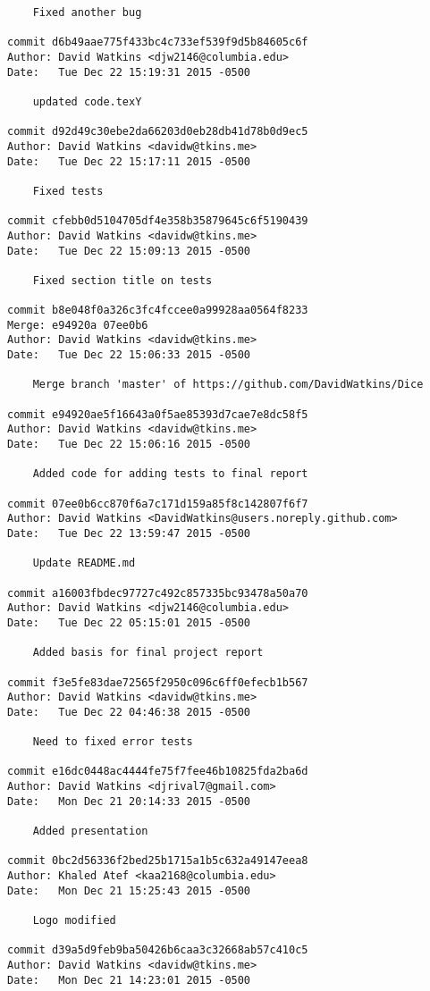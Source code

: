 \begin{verbatim}
    Fixed another bug

commit d6b49aae775f433bc4c733ef539f9d5b84605c6f
Author: David Watkins <djw2146@columbia.edu>
Date:   Tue Dec 22 15:19:31 2015 -0500

    updated code.texY

commit d92d49c30ebe2da66203d0eb28db41d78b0d9ec5
Author: David Watkins <davidw@tkins.me>
Date:   Tue Dec 22 15:17:11 2015 -0500

    Fixed tests

commit cfebb0d5104705df4e358b35879645c6f5190439
Author: David Watkins <davidw@tkins.me>
Date:   Tue Dec 22 15:09:13 2015 -0500

    Fixed section title on tests

commit b8e048f0a326c3fc4fccee0a99928aa0564f8233
Merge: e94920a 07ee0b6
Author: David Watkins <davidw@tkins.me>
Date:   Tue Dec 22 15:06:33 2015 -0500

    Merge branch 'master' of https://github.com/DavidWatkins/Dice

commit e94920ae5f16643a0f5ae85393d7cae7e8dc58f5
Author: David Watkins <davidw@tkins.me>
Date:   Tue Dec 22 15:06:16 2015 -0500

    Added code for adding tests to final report

commit 07ee0b6cc870f6a7c171d159a85f8c142807f6f7
Author: David Watkins <DavidWatkins@users.noreply.github.com>
Date:   Tue Dec 22 13:59:47 2015 -0500

    Update README.md

commit a16003fbdec97727c492c857335bc93478a50a70
Author: David Watkins <djw2146@columbia.edu>
Date:   Tue Dec 22 05:15:01 2015 -0500

    Added basis for final project report

commit f3e5fe83dae72565f2950c096c6ff0efecb1b567
Author: David Watkins <davidw@tkins.me>
Date:   Tue Dec 22 04:46:38 2015 -0500

    Need to fixed error tests

commit e16dc0448ac4444fe75f7fee46b10825fda2ba6d
Author: David Watkins <djrival7@gmail.com>
Date:   Mon Dec 21 20:14:33 2015 -0500

    Added presentation

commit 0bc2d56336f2bed25b1715a1b5c632a49147eea8
Author: Khaled Atef <kaa2168@columbia.edu>
Date:   Mon Dec 21 15:25:43 2015 -0500

    Logo modified

commit d39a5d9feb9ba50426b6caa3c32668ab57c410c5
Author: David Watkins <davidw@tkins.me>
Date:   Mon Dec 21 14:23:01 2015 -0500


\end{verbatim}
